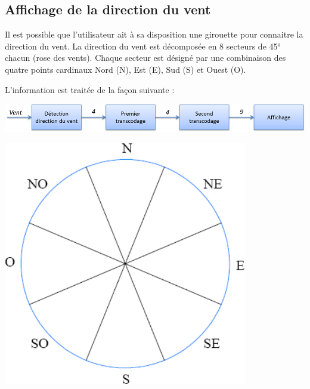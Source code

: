 \documentclass[10pt]{article}
\newif\ifprof
\begin{document}
\subsection{Affichage de la direction du vent}
\ifprof
\else
\begin{minipage}[c]{.7\linewidth}
Il est possible que l'utilisateur ait à sa disposition une girouette pour connaitre la direction du vent. 
La direction du vent est décomposée en 8 secteurs de 45° chacun (rose des vents). Chaque secteur est désigné par une combinaison des quatre points cardinaux Nord (N), Est (E), Sud (S) et Ouest (O).

L'information est traitée de la façon suivante : 
\begin{center}
\includegraphics[width=.95\textwidth]{images/chaineMesure}
\end{center}

\end{minipage} \hfill
\begin{minipage}[c]{.28\linewidth}
\begin{center}
\includegraphics[width=.95\textwidth]{images/RoseVents}
\end{center}
\end{minipage} 
\end{document}
